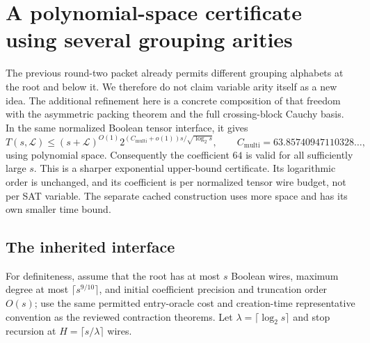 \section{A polynomial-space certificate using several grouping arities}
\label{sec:variable-arity}

The previous round-two packet already permits different grouping alphabets
at the root and below it.  We therefore do not claim variable arity itself
as a new idea.  The additional refinement here is a concrete composition of
that freedom with the asymmetric packing theorem and the full crossing-block
Cauchy basis.  In the same normalized Boolean tensor interface, it gives
\[
 T(s,\mathcal L)\le (s+\mathcal L)^{O(1)}
 2^{(C_{\mathrm{multi}}+o(1))s/\sqrt{\log_2s}},
 \qquad C_{\mathrm{multi}}=63.85740947110328\ldots,
\]
using polynomial space.  Consequently the coefficient $64$ is valid for
all sufficiently large $s$.  This is a sharper exponential upper-bound
certificate.  Its logarithmic order is unchanged, and its coefficient is
per normalized tensor wire budget, not per SAT variable.  The separate
cached construction uses more space and has its own smaller time bound.

\subsection{The inherited interface}

For definiteness, assume that the root has at most $s$ Boolean wires,
maximum degree at most $\lceil s^{9/10}\rceil$, and initial coefficient
precision and truncation order $O(s)$; use the same permitted entry-oracle
cost and creation-time representative convention as the reviewed
contraction theorems.  Let $\lambda=\lceil\log_2s\rceil$ and stop recursion
at $H=\lceil s/\lambda\rceil$ wires.

